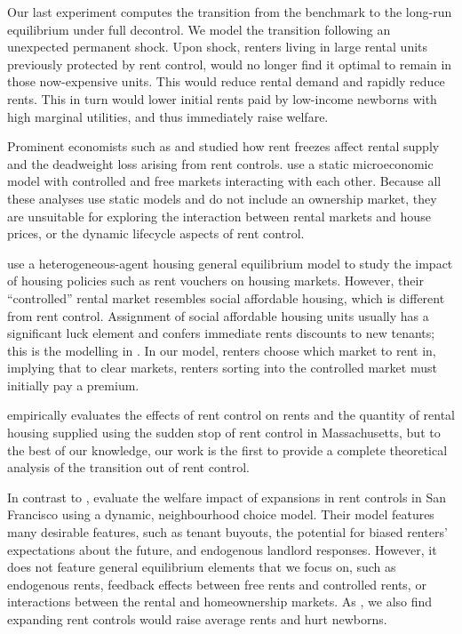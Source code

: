 \documentclass[parskip=full]{article}
\begin{document}
Our last experiment computes the transition from the benchmark to the long-run equilibrium under full decontrol. We model the transition following an unexpected permanent shock. Upon shock, renters living in large rental units previously protected by rent control, would no longer find it optimal to remain in those now-expensive units. This would reduce rental demand and rapidly reduce rents. This in turn would lower initial rents paid by low-income newborns with high marginal utilities, and thus immediately raise welfare. 

Prominent economists such as \citet{hayek-1929} and \citet{fs-1946} studied how rent freezes affect rental supply and the deadweight loss arising from rent controls. \citet{fallis-1985} use a static microeconomic model with controlled and free markets interacting with each other. Because all these analyses use static models and do not include an ownership market, they are unsuitable for exploring the interaction between rental markets and house prices, or the dynamic lifecycle aspects of rent control.

\citet{fmn-2022} use a heterogeneous-agent housing general equilibrium model to study the impact of housing policies such as rent vouchers on housing markets. However, their “controlled” rental market resembles social affordable housing, which is different from rent control. Assignment of social affordable housing units usually has a significant luck element and confers immediate rents discounts to new tenants; this is the modelling in \citet{fmn-2022}. In our model, renters choose which market to rent in, implying that to clear markets, renters sorting into the controlled market must initially pay a premium.

\citet{sims-2007} empirically evaluates the effects of rent control on rents and the quantity of rental housing supplied using the sudden stop of rent control in Massachusetts, but to the best of our knowledge, our work is the first to provide a complete theoretical analysis of the transition out of rent control. 

In contrast to \citet{sims-2007}, \citet{diamond-2019} evaluate the welfare impact of expansions in rent controls in San Francisco using a dynamic, neighbourhood choice model. Their model features many desirable features, such as tenant buyouts, the potential for biased renters' expectations about the future, and endogenous landlord responses. However, it does not feature general equilibrium elements that we focus on, such as endogenous rents, feedback effects between free rents and controlled rents, or interactions between the rental and homeownership markets. As \citet{diamond-2019}, we also find expanding rent controls would raise average rents and hurt newborns.
\end{document}
